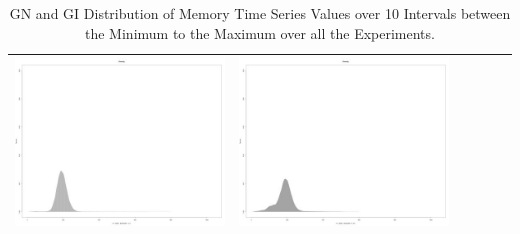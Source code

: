 \begin{table}[htbp]
{\begin{tabular}{l | ccccc}
\begin{minipage}{.15\textwidth}
     			 	\includegraphics[width=\linewidth]{images/mema-dens-graph/I14}
    				 \end{minipage}
    			   &	 \begin{minipage}{.15\textwidth}\vspace{2pt}     							
     			 	\includegraphics[width=\linewidth]{images/mema-dens-graph/I15}
    				 \end{minipage}\\
		\hline %
	 \end{tabular}
	}
	\caption[\textsc{Analyser} Investigation Stack - Level 2 - Pattern Identification - Memory Distribution - Baselines GN and GI]{GN and GI Distribution of Memory Time Series Values over 10 Intervals between the Minimum to the Maximum over all the Experiments.} 
	\label{fig:level2-memory-density-graph}
	\end{table}